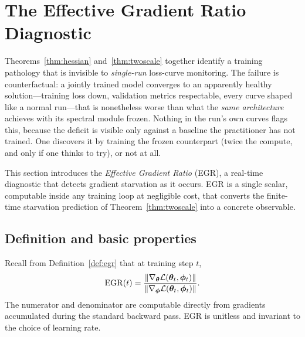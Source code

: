 \section{The Effective Gradient Ratio Diagnostic}
\label{sec:egr}

Theorems~\ref{thm:hessian} and~\ref{thm:twoscale} together identify a
training pathology that is invisible to \emph{single-run} loss-curve
monitoring. The failure is counterfactual: a jointly trained model
converges to an apparently healthy solution---training loss down,
validation metrics respectable, every curve shaped like a normal
run---that is nonetheless worse than what the \emph{same
architecture} achieves with its spectral module frozen. Nothing in
the run's own curves flags this, because the deficit is visible only
against a baseline the practitioner has not trained. One discovers
it by training the frozen counterpart (twice the compute, and only
if one thinks to try), or not at all.

This section introduces the \emph{Effective Gradient Ratio} (EGR), a
real-time diagnostic that detects gradient starvation as it occurs.
EGR is a single scalar, computable inside any training loop at
negligible cost, that converts the finite-time starvation prediction
of Theorem~\ref{thm:twoscale} into a concrete observable.

\subsection{Definition and basic properties}

Recall from Definition~\ref{def:egr} that at training step $t$,
\[
    \mathrm{EGR}(t) = \frac{\left\lVert\nabla_{\boldsymbol{\theta}} \mathcal{L}({\boldsymbol{\theta}}_t, {\boldsymbol{\phi}}_t)\right\rVert}
                   {\left\lVert\nabla_{\boldsymbol{\phi}} \mathcal{L}({\boldsymbol{\theta}}_t, {\boldsymbol{\phi}}_t)\right\rVert}.
\]
The numerator and denominator are computable directly from gradients
accumulated during the standard backward pass. EGR is unitless and
invariant to the choice of learning rate.

